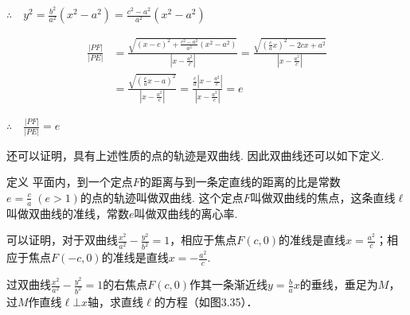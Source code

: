 $\therefore\quad y^2=\frac{b^2}{a^2}(x^2-a^2)=\frac{c^2-a^2}{a^2}(x^2-a^2)$

\[\begin{split}
    \frac{|PF|}{|PE|}&=\frac{\sqrt{(x-c)^2+\frac{c^2-a^2}{a^2}(x^2-a^2)}}{\left|x-\frac{a^2}{c}\right|}=\frac{\sqrt{\left(\frac{c}{a}x\right)^2-2cx+a^2}}{\left|x-\frac{a^2}{c}\right|}\\
    &=\frac{\sqrt{\left(\frac{c}{a}x-a\right)^2}}{\left|x-\frac{a^2}{c}\right|}=\frac{\frac{c}{a}\left|x-\frac{a^2}{c}\right|}{\left|x-\frac{a^2}{c}\right|}=e
\end{split}\]

$\therefore\quad \frac{|PF|}{|PE|}=e$

还可以证明，具有上述性质的点的轨迹是双曲线. 因此双曲线还可以如下定义.

\begin{thm}
   {定义} 平面内，到一个定点$F$的距离与到一条定直线的距离的比是常数$e=\frac{c}{a}\; (e>1)$的点的轨迹叫做双曲线. 这个定点$F$叫做双曲线的焦点，这条直线$\ell$叫做双曲线的准线，常数$e$叫做双曲线的离心率. 
\end{thm}

可以证明，对于双曲线$\frac{x^2}{a^2}-\frac{y^2}{b^2}=1$，相应于焦点$F(c,0)$的准线是直线$x=\frac{a^2}{c}$；相应于焦点$F(-c,0)$的准线是直线$x=-\frac{a^2}{c}$.

\begin{example}
过双曲线$\frac{x^2}{a^2}-\frac{y^2}{b^2}=1$的右焦点$F(c,0)$作其一条渐近线$y=\frac{b}{a}x$的垂线，垂足为$M$，过$M$作直线$\ell\bot x$轴，求直线$\ell$的方程（如图3.35）．

\end{example}

